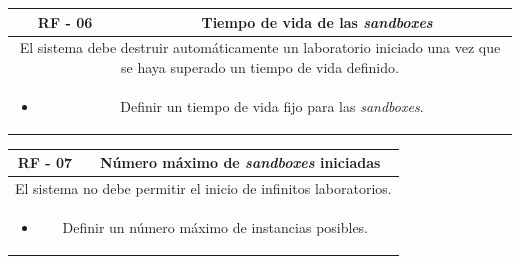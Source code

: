                 \begin{table}[!htbp]
                    \centering
                    \begin{tabular}{|c|c|}
                        \hline
                        \textbf{RF - 06} & \textbf{Tiempo de vida de las \textit{sandboxes}} \\
                        \hline
                        \multicolumn{2}{|p{15cm}|}{
                            El sistema debe destruir automáticamente un laboratorio iniciado una vez que se haya superado un tiempo de vida definido.
                        } \\
                        \hline
                        \multicolumn{2}{|p{15cm}|}{
                            \begin{itemize}
                                \item Definir un tiempo de vida fijo para las \textit{sandboxes}.
                            \end{itemize}
                            } \\
                        \hline
                    \end{tabular}
                    \label{tab:RF6}
                \end{table}
                
                \begin{table}[!htbp]
                    \centering
                    \begin{tabular}{|c|c|}
                        \hline
                        \textbf{RF - 07} & \textbf{Número máximo de \textit{sandboxes} iniciadas} \\
                        \hline
                        \multicolumn{2}{|p{15cm}|}{
                            El sistema no debe permitir el inicio de infinitos laboratorios.
                        } \\
                        \hline
                        \multicolumn{2}{|p{15cm}|}{
                            \begin{itemize}
                                \item Definir un número máximo de instancias posibles.
                            \end{itemize}
                            } \\
                        \hline
                    \end{tabular}
                    \label{tab:RF7}
                \end{table}
                

